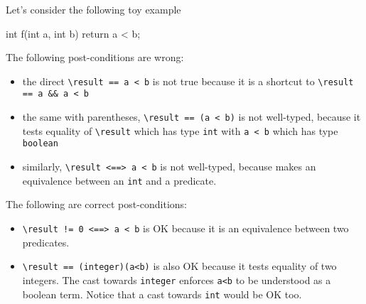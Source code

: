 
Let's consider the following toy example
\begin{c}
  int f(int a, int b) { return a < b; }
\end{c}
The following post-conditions are wrong:
\begin{itemize}
\item the direct \verb|\result == a < b| is not true because it is a shortcut to \verb|\result == a && a < b|
\item the same with parentheses, \verb|\result == (a < b)| is not well-typed, because it tests equality of \verb|\result| which has type \verb|int| with \verb|a < b| which has type \verb|boolean|
\item similarly, \verb|\result <==> a < b| is not well-typed, because makes an equivalence between an \verb|int| and a predicate. 
\end{itemize}
The following are correct post-conditions:
\begin{itemize}
\item \verb|\result != 0 <==> a < b| is OK because it is an equivalence between two predicates.
\item \verb|\result == (integer)(a<b)| is also OK because it tests
  equality of two integers. The cast towards \verb|integer| enforces
  \verb|a<b| to be understood as a boolean term. Notice that a cast towards \verb|int| would be OK too.
\end{itemize}

